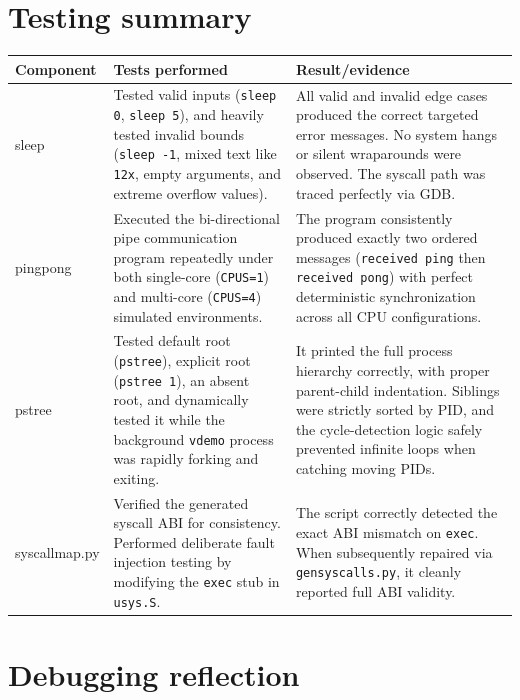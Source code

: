 \documentclass[11pt,a4paper]{article}
\begin{document}
\section*{Testing summary}
\begin{tabularx}{\textwidth}{@{}lXX@{}}
\toprule
Component & Tests performed & Result/evidence \\
\midrule
sleep & Tested valid inputs (\texttt{sleep 0}, \texttt{sleep 5}), and heavily tested invalid bounds (\texttt{sleep -1}, mixed text like \texttt{12x}, empty arguments, and extreme overflow values). & All valid and invalid edge cases produced the correct targeted error messages. No system hangs or silent wraparounds were observed. The syscall path was traced perfectly via GDB. \\
pingpong & Executed the bi-directional pipe communication program repeatedly under both single-core (\texttt{CPUS=1}) and multi-core (\texttt{CPUS=4}) simulated environments. & The program consistently produced exactly two ordered messages (\texttt{received ping} then \texttt{received pong}) with perfect deterministic synchronization across all CPU configurations. \\
pstree & Tested default root (\texttt{pstree}), explicit root (\texttt{pstree 1}), an absent root, and dynamically tested it while the background \texttt{vdemo} process was rapidly forking and exiting. & It printed the full process hierarchy correctly, with proper parent-child indentation. Siblings were strictly sorted by PID, and the cycle-detection logic safely prevented infinite loops when catching moving PIDs. \\
syscallmap.py & Verified the generated syscall ABI for consistency. Performed deliberate fault injection testing by modifying the \texttt{exec} stub in \texttt{usys.S}. & The script correctly detected the exact ABI mismatch on \texttt{exec}. When subsequently repaired via \texttt{gensyscalls.py}, it cleanly reported full ABI validity. \\
\bottomrule
\end{tabularx}

\section*{Debugging reflection}
\end{document}

